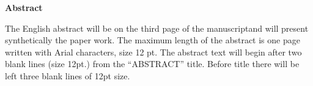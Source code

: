 \thispagestyle{pagestyle}

\begin{center}
    \textbf{\fontsize{20pt}{24pt} \selectfont Abstract}
\end{center}

The English abstract will be on the third page of the manuscriptand will present synthetically the paper work. The maximum length of the abstract is one page written with Arial characters, size 12 pt. The abstract text will begin after two blank lines (size 12pt.) from the “ABSTRACT” title. Before title there will be left three blank lines of 12pt size.

\vfill